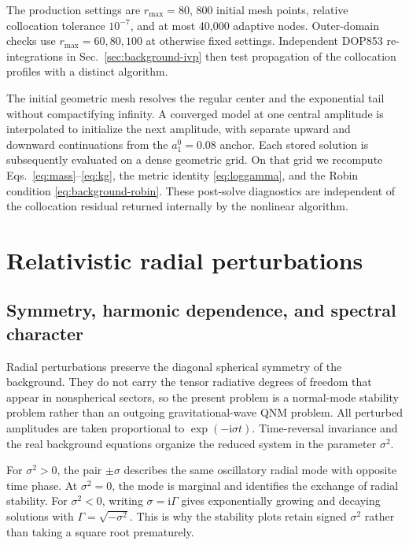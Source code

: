 \documentclass[aps,prd,preprint,onecolumn,nofootinbib,superscriptaddress,showkeys]{revtex4-2}
\newcommand{\ii}{\mathrm{i}}
\newcommand{\sigmatwo}{\sigma^{2}}
\newcommand{\rmax}{r_{\mathrm{max}}}
\begin{document}
The production settings are $\rmax=80$, 800 initial mesh points, relative collocation tolerance $10^{-7}$, and at most 40,000 adaptive nodes. Outer-domain checks use $\rmax=60,80,100$ at otherwise fixed settings.  Independent DOP853 re-integrations in Sec.~\ref{sec:background-ivp} then test propagation of the collocation profiles with a distinct algorithm.

The initial geometric mesh resolves the regular center and the exponential tail without compactifying infinity. A converged model at one central amplitude is interpolated to initialize the next amplitude, with separate upward and downward continuations from the $a_{1}^{0}=0.08$ anchor. Each stored solution is subsequently evaluated on a dense geometric grid. On that grid we recompute Eqs.~\eqref{eq:mass}--\eqref{eq:kg}, the metric identity \eqref{eq:loggamma}, and the Robin condition \eqref{eq:background-robin}. These post-solve diagnostics are independent of the collocation residual returned internally by the nonlinear algorithm.





\section{Relativistic radial perturbations}\label{sec:radial}

\subsection{Symmetry, harmonic dependence, and spectral character}

Radial perturbations preserve the diagonal spherical symmetry of the background. They do not carry the tensor radiative degrees of freedom that appear in nonspherical sectors, so the present problem is a normal-mode stability problem rather than an outgoing gravitational-wave QNM problem. All perturbed amplitudes are taken proportional to $\exp(-\ii\sigma t)$. Time-reversal invariance and the real background equations organize the reduced system in the parameter $\sigmatwo$.

For $\sigmatwo>0$, the pair $\pm\sigma$ describes the same oscillatory radial mode with opposite time phase. At $\sigmatwo=0$, the mode is marginal and identifies the exchange of radial stability. For $\sigmatwo<0$, writing $\sigma=\ii\Gamma$ gives exponentially growing and decaying solutions with $\Gamma=\sqrt{-\sigmatwo}$. This is why the stability plots retain signed $\sigmatwo$ rather than taking a square root prematurely.
\end{document}
